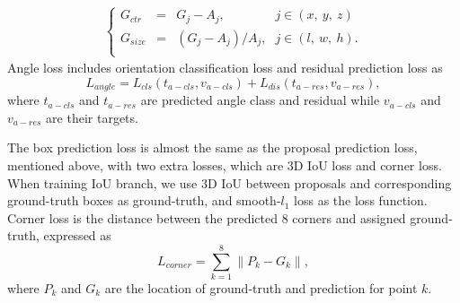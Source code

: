 \documentclass[10pt,twocolumn,letterpaper]{article}
\newcommand{\norm}[1]{\left\lVert#1\right\rVert}
\begin{document}
\begin{eqnarray} 
\left \{ \begin{array}{llll}
        G_{ctr}&=& G_j - A_j \textrm{,} & j \in (x,\ y,\ z)\\
        G_{size} &=& (G_j - A_j)/A_j \textrm{,} & j \in (l,\ w,\ h).\\
        \end{array} \right.
\end{eqnarray}
Angle loss includes orientation classification loss and residual prediction loss as
\begin{equation} \label{eq:anglereg}
L_{angle} = L_{cls}(t_{a-cls}, v_{a-cls}) + L_{dis}(t_{a-res}, v_{a-res}),
\end{equation}
where $t_{a-cls}$ and $t_{a-res}$ are predicted angle class and residual while $v_{a-cls}$ and $v_{a-res}$ are their targets. 

The box prediction loss is almost the same as the proposal prediction loss, mentioned above, with two extra losses, which are 3D IoU loss and corner loss. When training IoU branch, we use 3D IoU between proposals and corresponding ground-truth boxes as ground-truth, and smooth-$l_1$ loss as the loss function. Corner loss is the distance between the predicted 8 corners and assigned ground-truth, expressed as
\begin{equation} \label{eq:cornerloss}
L_{corner} = \sum_{k=1}^8 \norm{P_{k} - G_{k}},
\end{equation}
where $P_{k}$ and $G_{k}$ are the location of ground-truth and prediction for point $k$.  
\end{document}
